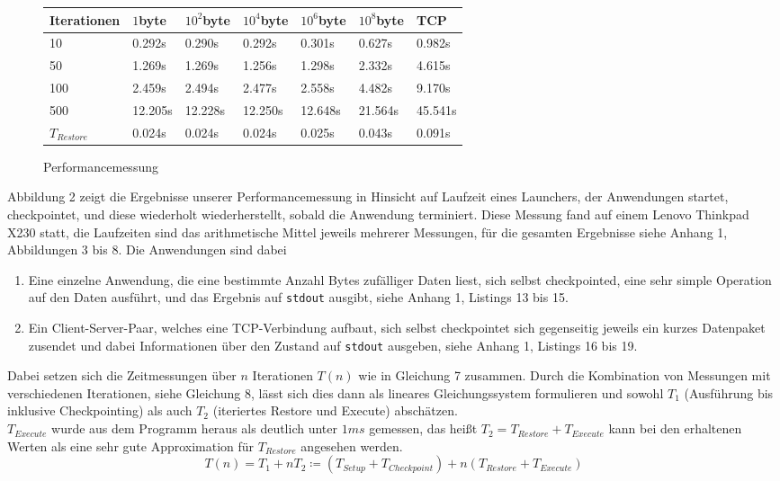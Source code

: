 \documentclass[a4paper]{article}
\begin{document}
\begin{figure}
\begin{center}
\begin{tabular}{| l | l  l  l  l  l | l |}
    \toprule
    Iterationen & $1$byte & $10^2$byte & $10^4$byte & $10^6$byte & $10^8$byte & TCP \\
    \midrule
    10 & 0.292s & 0.290s & 0.292s & 0.301s & 0.627s & 0.982s \\
    50 & 1.269s & 1.269s & 1.256s & 1.298s & 2.332s & 4.615s \\
    100 & 2.459s & 2.494s & 2.477s & 2.558s & 4.482s & 9.170s \\
    500 & 12.205s & 12.228s & 12.250s & 12.648s & 21.564s & 45.541s \\
    \midrule
    $T_{Restore}$ & 0.024s & 0.024s & 0.024s & 0.025s & 0.043s & 0.091s \\
    \bottomrule
\end{tabular}
\end{center}
    \caption{Performancemessung}
\end{figure}

Abbildung 2 zeigt die Ergebnisse unserer Performancemessung in Hinsicht auf Laufzeit eines Launchers, der Anwendungen startet, checkpointet, und diese wiederholt wiederherstellt, sobald die Anwendung terminiert. Diese Messung fand auf einem Lenovo Thinkpad X230 statt, die Laufzeiten sind das arithmetische Mittel jeweils mehrerer Messungen, für die gesamten Ergebnisse siehe Anhang 1, Abbildungen 3 bis 8.
Die Anwendungen sind dabei
\begin{enumerate}
    \item Eine einzelne Anwendung, die eine bestimmte Anzahl Bytes zufälliger Daten liest, sich selbst checkpointed, eine sehr simple Operation auf den Daten ausführt, und das Ergebnis auf \texttt{stdout} ausgibt, siehe Anhang 1, Listings 13 bis 15.
    \item Ein Client-Server-Paar, welches eine TCP-Verbindung aufbaut, sich selbst checkpointet sich gegenseitig jeweils ein kurzes Datenpaket zusendet und dabei Informationen über den Zustand auf \texttt{stdout} ausgeben, siehe Anhang 1, Listings 16 bis 19.
\end{enumerate}
Dabei setzen sich die Zeitmessungen über $n$ Iterationen $T(n)$ wie in Gleichung 7 zusammen. 
Durch die Kombination von Messungen mit verschiedenen Iterationen, siehe Gleichung 8, lässt sich dies dann als lineares Gleichungssystem formulieren und sowohl $T_1$ (Ausführung bis inklusive Checkpointing) als auch $T_2$ (iteriertes Restore und Execute) abschätzen. \\
$T_{Execute}$ wurde aus dem Programm heraus als deutlich unter $1{ms}$ gemessen, das heißt $T_2 = T_{Restore} + T_{Execute}$ kann bei den erhaltenen Werten als eine sehr gute Approximation für $T_{Restore}$ angesehen werden.
\begin{equation}
    T(n) = T_1 + n T_2 \coloneqq (T_{Setup} + T_{Checkpoint}) + n (T_{Restore} + T_{Execute})
\end{equation}
\end{document}
